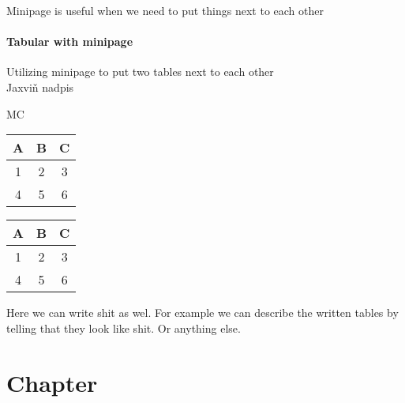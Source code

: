 \documentclass[11pt,a4paper]{report}
\theoremstyle{remark}
\theoremstyle{definition}
\begin{document}
				\noindent
				Minipage is useful when we need to put things next to each other
				\subsubsection*{Tabular with minipage}
				
					\noindent
					Utilizing minipage to put two tables next to each other\\
					
					\noindent
					Jaxviň nadpis
					
					\noindent
					\begin{minipage}{0.15\textwidth}
						{\Huge MC}
					\end{minipage}
					\begin{minipage}{0.85\textwidth}
						\lipsum[3]
					\end{minipage}
								
					\begin{minipage}{0.2\textwidth}
						\begin{tabular}{|c|c|c|}
							\hline
							A & B & C \\
							\hline
							1 & 2 & 3  \\
							\hline 
							4 & 5 & 6 \\
							\hline
						\end{tabular}
					\end{minipage}
					\begin{minipage}{0.2\textwidth}
						\begin{tabular}{c|c|c}
							A & B & C \\
							\hline
							1 & 2 & 3  \\
							\hline 
							4 & 5 & 6 \\
						\end{tabular}
					\end{minipage}
					\begin{minipage}{0.55\textwidth}
						Here we can write shit as wel. For example we can describe the written tables by telling that they look like shit. Or anything else.
					\end{minipage}
					\lipsum[1]
			
			
			
			\chapter{Chapter}
			
				\lipsum[1]
				\lipsum[2]
				\lipsum[3]
				\lipsum[4]
				\lipsum[5]
			
\end{document}
